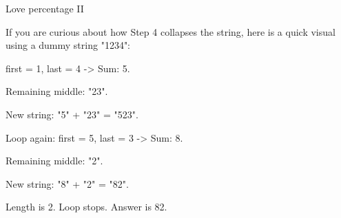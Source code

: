 \begin{tutorial}{Love percentage II}

If you are curious about how Step 4 collapses the string, here is a quick visual using a dummy string "1234":

first = 1, last = 4 -> Sum: 5.

Remaining middle: "23".

New string: "5" + "23" = "523".

Loop again: first = 5, last = 3 -> Sum: 8.

Remaining middle: "2".

New string: "8" + "2" = "82".

Length is 2. Loop stops. Answer is 82.

\end{tutorial}
